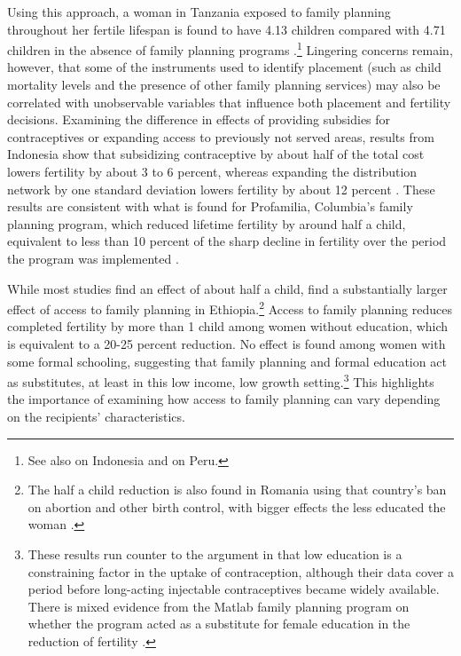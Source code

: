 Using this approach, a woman in Tanzania exposed to family planning throughout her fertile lifespan is found to have 4.13 children compared with 4.71 children in the absence of family planning programs \citep{angeles98}.\footnote{See also \citet{Angeles2005} on Indonesia and \citep{Angeles2005a} on Peru.} Lingering concerns remain, however, that some of the instruments used to identify placement (such as child mortality levels and the presence of other family planning services) may also be correlated with unobservable variables that influence both placement and fertility decisions. Examining the difference in effects of providing subsidies for contraceptives or expanding access to previously not served areas, results from Indonesia show that subsidizing contraceptive by about half of the total cost lowers fertility by about 3 to 6 percent, whereas expanding the distribution network by one standard deviation lowers fertility by about 12 percent \citep{Molyneaux2000}. These results are consistent with what is found for Profamilia, Columbia's family planning program, which reduced lifetime fertility by around half a child, equivalent to less than 10 percent of the sharp decline in fertility over the period the program was implemented \citep{Miller2010}.

While most studies find an effect of about half a child, \citet{Portner2011} find a substantially larger effect of access to family planning in Ethiopia.\footnote{The half a child reduction is also found in Romania using that country's ban on abortion and other birth control, with bigger effects the less educated the woman \citep{Pop-Eleches2010}.} Access to family planning reduces completed fertility by more than 1 child among women without education, which is equivalent to a 20-25 percent reduction. No effect is found among women with some formal schooling, suggesting that family planning and formal education act as substitutes, at least in this low income, low growth setting.\footnote{These results run counter to the argument in \citet{Feyisetan1996} that low education is a constraining factor in the uptake of contraception, although their data cover a period before long-acting injectable contraceptives became widely available. There is mixed evidence from the Matlab family planning program on whether the program acted as a substitute for female education in the reduction of fertility \citep{Sinha2005,Joshi2007}.} This highlights the importance of examining how access to family planning can vary depending on the recipients' characteristics.

